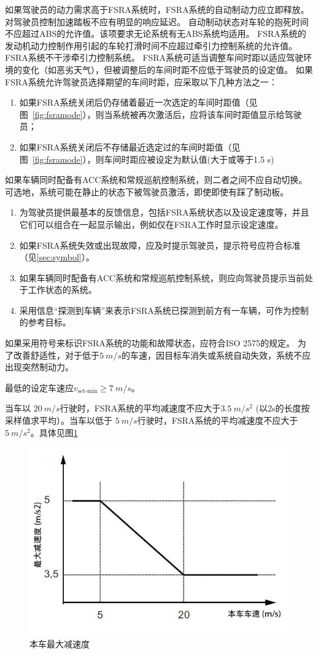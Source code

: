 \documentclass[is,copyright,is]{isov2}
\begin{document}
如果驾驶员的动力需求高于FSRA系统时，FSRA系统的自动制动力应立即释放。对驾驶员控制加速踏板不应有明显的响应延迟。
\sssclause{}
自动制动状态对车轮的抱死时间不应超过ABS的允许值。该项要求无论系统有无ABS系统均适用。
\sssclause{}
 FSRA系统的发动机动力控制作用引起的车轮打滑时间不应超过牵引力控制系统的允许值。 FSRA系统不干涉牵引力控制系统。
\sssclause{}
FSRA系统可适当调整车间时距以适应驾驶环境的变化（如恶劣天气），但被调整后的车间时距不应低于驾驶员的设定值。
\sssclause{}
如果FSRA系统允许驾驶员选择期望的车间时距，应采取以下几种方法之一：
\begin{enumerate}
	\item 如果FSRA系统关闭后仍存储着最近一次选定的车间时距值（见图~\ref{fig:fsramode}），则当系统被再次激活后，应将该车间时距值显示给驾驶员；
	\item 如果FSRA系统关闭后不存储最近选定过的车间时距值（见图~\ref{fig:fsramode}），则车间时距应被设定为默认值(大于或等于1.5 s)
\end{enumerate}
\sssclause{}
如果车辆同时配备有ACC系统和常规巡航控制系统，则二者之间不应自动切换。
\sssclause{}
可选地，系统可能在静止的状态下被驾驶员激活，即使即使有踩了制动板。
\begin{enumerate}
	\item 为驾驶员提供最基本的反馈信息，包括FSRA系统状态以及设定速度等，并且它们可以组合在一起显示输出，例如仅在FSRA工作时显示设定速度。
	\item  如果FSRA系统失效或出现故障，应及时提示驾驶员，提示符号应符合标准（见\ref{sec:symbol}）。
	\item 如果车辆同时配备有ACC系统和常规巡航控制系统，则应向驾驶员提示当前处于工作状态的系统。
	\item 采用信息“探测到车辆”来表示FSRA系统已探测到前方有一车辆，可作为控制的参考目标。
\end{enumerate}

\label{sec:symbol}
如果采用符号来标识FSRA系统的功能和故障状态，应符合ISO 2575的规定。
\label{6.4}
为了改善舒适性，对于低于$\SI{5}{m/s}$的车速，因目标车消失或系统自动失效，系统不应出现突然制动力。

最低的设定车速应$v_\text{set-min} \geq\SI{7}{m/s}$。

当车以 $\SI{20}{m/s}$行驶时，FSRA系统的平均减速度不应大于$\SI{3.5}{m/s^2}$ (以2s的长度按采样值求平均）。当车以低于 $\SI{5}{m/s}$行驶时，FSRA系统的平均减速度不应大于$\SI{5}{m/s^2}$。具体见图\ref{fig:dmax}
\begin{figure}[htbp]
	\centering
	\includegraphics[width=0.7\linewidth]{figures/dmax}
	\caption{本车最大减速度}
	\label{fig:dmax}
\end{figure}
\end{document}
